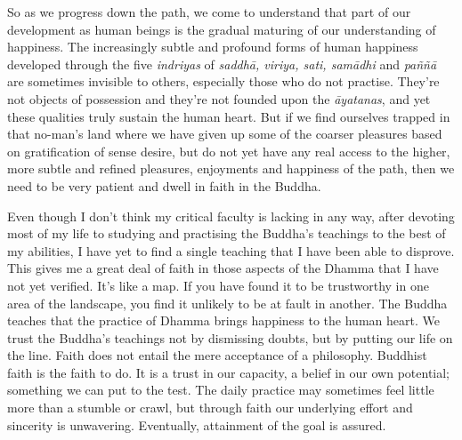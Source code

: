 So as we progress down the path, we come to understand that part of our
development as human beings is the gradual maturing of our understanding
of happiness. The increasingly subtle and profound forms of human
happiness developed through the five \emph{indriyas} of \emph{saddhā,
viriya, sati, samādhi} and \emph{paññā} are sometimes invisible to
others, especially those who do not practise. They're not objects of
possession and they're not founded upon the \emph{āyatanas}, and yet
these qualities truly sustain the human heart. But if we find ourselves
trapped in that no-man's land where we have given up some of the coarser
pleasures based on gratification of sense desire, but do not yet have
any real access to the higher, more subtle and refined pleasures,
enjoyments and happiness of the path, then we need to be very patient
and dwell in faith in the Buddha.

Even though I don't think my critical faculty is lacking in any way,
after devoting most of my life to studying and practising the Buddha's
teachings to the best of my abilities, I have yet to find a single
teaching that I have been able to disprove. This gives me a great deal
of faith in those aspects of the Dhamma that I have not yet verified.
It's like a map. If you have found it to be trustworthy in one area of
the landscape, you find it unlikely to be at fault in another. The
Buddha teaches that the practice of Dhamma brings happiness to the human
heart. We trust the Buddha's teachings not by dismissing doubts, but by
putting our life on the line. Faith does not entail the mere acceptance
of a philosophy. Buddhist faith is the faith to do. It is a trust in our
capacity, a belief in our own potential; something we can put to the
test. The daily practice may sometimes feel little more than a stumble
or crawl, but through faith our underlying effort and sincerity is
unwavering. Eventually, attainment of the goal is assured.

